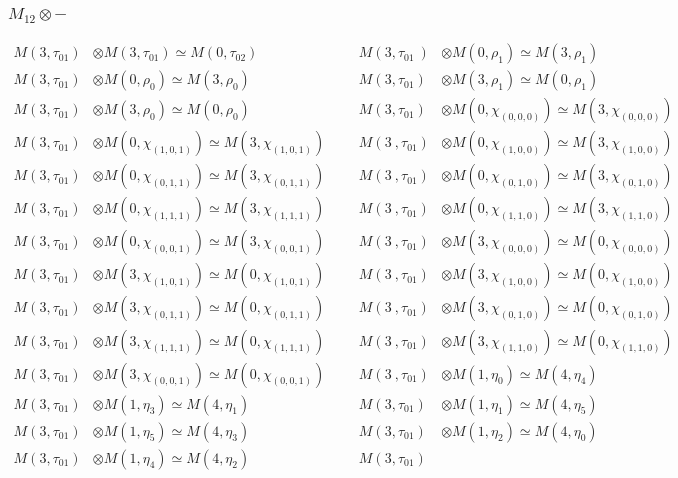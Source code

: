 \subsubsection{$M_12\otimes -$}
\begin{align*}
M(3,\tau_{01}) &\otimes M(3,\tau_{01}) \simeq M(0,\tau_{02}) &&& M(3,\tau_{01}\
) &\otimes M(0,\rho_{1}) \simeq M(3,\rho_{1})\\
M(3,\tau_{01}) &\otimes M(0,\rho_{0}) \simeq M(3,\rho_{0}) &&& M(3,\tau_{01}) \
&\otimes M(3,\rho_{1}) \simeq M(0,\rho_{1})\\
M(3,\tau_{01}) &\otimes M(3,\rho_{0}) \simeq M(0,\rho_{0}) &&& M(3,\tau_{01}) \
&\otimes M(0,\chi_{(0,0,0)}) \simeq M(3,\chi_{(0,0,0)})\\
M(3,\tau_{01}) &\otimes M(0,\chi_{(1,0,1)}) \simeq M(3,\chi_{(1,0,1)}) &&& M(3\
,\tau_{01}) &\otimes M(0,\chi_{(1,0,0)}) \simeq M(3,\chi_{(1,0,0)})\\
M(3,\tau_{01}) &\otimes M(0,\chi_{(0,1,1)}) \simeq M(3,\chi_{(0,1,1)}) &&& M(3\
,\tau_{01}) &\otimes M(0,\chi_{(0,1,0)}) \simeq M(3,\chi_{(0,1,0)})\\
M(3,\tau_{01}) &\otimes M(0,\chi_{(1,1,1)}) \simeq M(3,\chi_{(1,1,1)}) &&& M(3\
,\tau_{01}) &\otimes M(0,\chi_{(1,1,0)}) \simeq M(3,\chi_{(1,1,0)})\\
M(3,\tau_{01}) &\otimes M(0,\chi_{(0,0,1)}) \simeq M(3,\chi_{(0,0,1)}) &&& M(3\
,\tau_{01}) &\otimes M(3,\chi_{(0,0,0)}) \simeq M(0,\chi_{(0,0,0)})\\
M(3,\tau_{01}) &\otimes M(3,\chi_{(1,0,1)}) \simeq M(0,\chi_{(1,0,1)}) &&& M(3\
,\tau_{01}) &\otimes M(3,\chi_{(1,0,0)}) \simeq M(0,\chi_{(1,0,0)})\\
M(3,\tau_{01}) &\otimes M(3,\chi_{(0,1,1)}) \simeq M(0,\chi_{(0,1,1)}) &&& M(3\
,\tau_{01}) &\otimes M(3,\chi_{(0,1,0)}) \simeq M(0,\chi_{(0,1,0)})\\
M(3,\tau_{01}) &\otimes M(3,\chi_{(1,1,1)}) \simeq M(0,\chi_{(1,1,1)}) &&& M(3\
,\tau_{01}) &\otimes M(3,\chi_{(1,1,0)}) \simeq M(0,\chi_{(1,1,0)})\\
M(3,\tau_{01}) &\otimes M(3,\chi_{(0,0,1)}) \simeq M(0,\chi_{(0,0,1)}) &&& M(3\
,\tau_{01}) &\otimes M(1,\eta_{0}) \simeq M(4,\eta_{4})\\
M(3,\tau_{01}) &\otimes M(1,\eta_{3}) \simeq M(4,\eta_{1}) &&& M(3,\tau_{01}) \
&\otimes M(1,\eta_{1}) \simeq M(4,\eta_{5})\\
M(3,\tau_{01}) &\otimes M(1,\eta_{5}) \simeq M(4,\eta_{3}) &&& M(3,\tau_{01}) \
&\otimes M(1,\eta_{2}) \simeq M(4,\eta_{0})\\
M(3,\tau_{01}) &\otimes M(1,\eta_{4}) \simeq M(4,\eta_{2}) &&& M(3,\tau_{01}) \

\end{align*}
